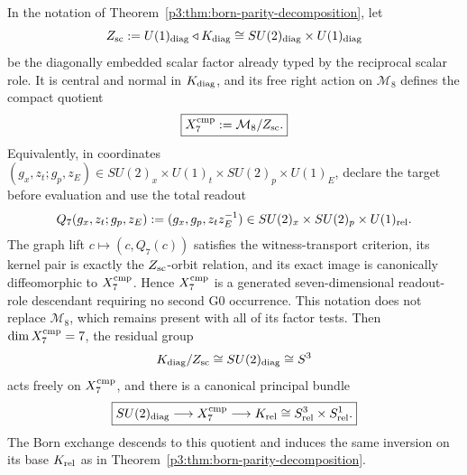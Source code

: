 \documentclass[12pt,a4paper]{article}
\begin{document}
\begin{theorem}
\label{p3b:thm:canonical-compact-seven-quotient}
In the notation of Theorem~\ref{p3:thm:born-parity-decomposition}, let
\[
 Z_{\rm sc}:=U(1)_{\rm diag}\triangleleft K_{\rm diag}
 \cong SU(2)_{\rm diag}\times U(1)_{\rm diag}
\]
be the diagonally embedded scalar factor already typed by the reciprocal
scalar role.  It is central and normal in \(K_{\rm diag}\), and its free
right action on \(\mathcal M_8\) defines the compact quotient
\[
 \boxed{X_7^{\rm cmp}:=\mathcal M_8/Z_{\rm sc}.}
\]
Equivalently, in coordinates
\((g_x,z_t;g_p,z_E)\in
SU(2)_x\times U(1)_t\times SU(2)_p\times U(1)_E\), declare the target before
evaluation and use the total readout
\[
 Q_7(g_x,z_t;g_p,z_E):=(g_x,g_p,z_tz_E^{-1})
 \in SU(2)_x\times SU(2)_p\times U(1)_{\rm rel}.
\]
The graph lift \(c\mapsto(c,Q_7(c))\) satisfies the witness-transport
criterion, its kernel pair is exactly the \(Z_{\rm sc}\)-orbit relation, and
its exact image is canonically diffeomorphic to \(X_7^{\rm cmp}\).  Hence
\(X_7^{\rm cmp}\) is a generated seven-dimensional readout-role descendant
requiring no second G0 occurrence.  This notation does not replace
\(\mathcal M_8\), which remains present with all of its factor tests.
Then \(\dim X_7^{\rm cmp}=7\), the residual group
\[
 K_{\rm diag}/Z_{\rm sc}\cong SU(2)_{\rm diag}\cong S^3
\]
acts freely on \(X_7^{\rm cmp}\), and there is a canonical principal bundle
\[
 \boxed{
 SU(2)_{\rm diag}\longrightarrow X_7^{\rm cmp}
 \longrightarrow K_{\rm rel}\cong S^3_{\rm rel}\times S^1_{\rm rel}.}
\]
The Born exchange descends to this quotient and induces the same inversion on
its base \(K_{\rm rel}\) as in
Theorem~\ref{p3:thm:born-parity-decomposition}.
\end{theorem}
\end{document}
